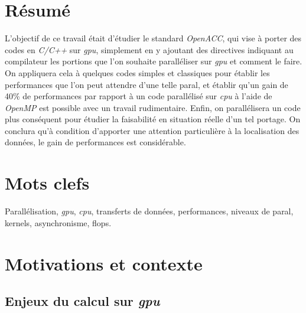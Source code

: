 \documentclass{article}
\begin{document}
\newpage

\section{Résumé}

L'objectif de ce travail était d'étudier le standard \textit{OpenACC}, qui vise à porter des codes en \textit{C/C++} sur \textit{\gls{gpu}}, simplement en y ajoutant des directives indiquant au compilateur les portions que l'on souhaite paralléliser sur \textit{\gls{gpu}} et comment le faire. On appliquera cela à quelques codes simples et classiques pour établir les performances que l'on peut attendre d'une telle \gls{paral}, et établir qu'un gain de 40\% de performances par rapport à un code parallélisé sur \textit{\gls{cpu}} à l'aide de \textit{OpenMP} est possible avec un travail rudimentaire. Enfin, on parallélisera un code plus conséquent pour étudier la faisabilité en situation réelle d'un tel portage. On conclura qu'à condition d'apporter une attention particulière à la localisation des données, le gain de performances est considérable.

\section{Mots clefs}

Parallélisation, \textit{\gls{gpu}}, \textit{\gls{cpu}}, transferts de données, performances, niveaux de \gls{paral}, kernels, asynchronisme, \gls{flops}.

\newpage

\printglossaries

\newpage

\mainmatter

\section{Motivations et contexte}

\subsection{Enjeux du calcul sur \textit{\gls{gpu}}}
\end{document}
